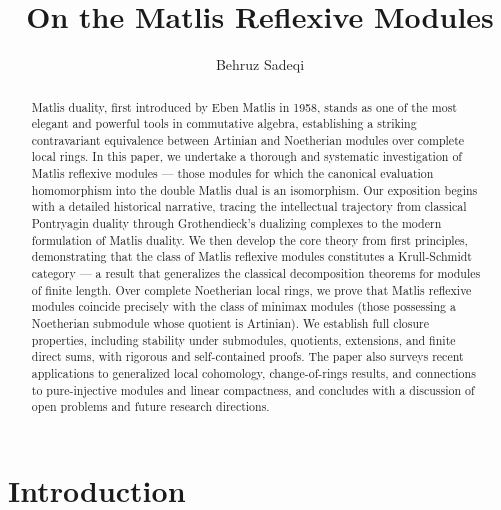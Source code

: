 \documentclass{kms-c}
\theoremstyle{plain}
\theoremstyle{definition}
\theoremstyle{remark}
\begin{document}
\title[On the Matlis Reflexive Modules]
{On the Matlis Reflexive Modules}

\author[B. Sadeqi]{Behruz Sadeqi}
\address{Behruz Sadeqi \\ Department of Mathematics, Mara.C.,
	 \\ Islamic Azad University \\ Marand, Iran}


\begin{abstract}
Matlis duality, first introduced by Eben Matlis in 1958, stands as one of the most elegant and powerful tools in commutative algebra, establishing a striking contravariant equivalence between Artinian and Noetherian modules over complete local rings. In this paper, we undertake a thorough and systematic investigation of Matlis reflexive modules --- those modules for which the canonical evaluation homomorphism into the double Matlis dual is an isomorphism. Our exposition begins with a detailed historical narrative, tracing the intellectual trajectory from classical Pontryagin duality through Grothendieck's dualizing complexes to the modern formulation of Matlis duality. We then develop the core theory from first principles, demonstrating that the class of Matlis reflexive modules constitutes a Krull-Schmidt category --- a result that generalizes the classical decomposition theorems for modules of finite length. Over complete Noetherian local rings, we prove that Matlis reflexive modules coincide precisely with the class of minimax modules (those possessing a Noetherian submodule whose quotient is Artinian). We establish full closure properties, including stability under submodules, quotients, extensions, and finite direct sums, with rigorous and self-contained proofs. The paper also surveys recent applications to generalized local cohomology, change-of-rings results, and connections to pure-injective modules and linear compactness, and concludes with a discussion of open problems and future research directions.
\end{abstract}

\maketitle

\section{Introduction}
\end{document}
